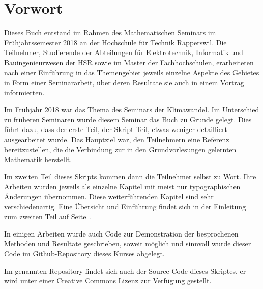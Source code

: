 %
%
%
\chapter*{Vorwort}
\rhead{}
Dieses Buch entstand im Rahmen des Mathematischen Seminars
im Frühjahrssemester 2018 an der Hochschule für Technik Rapperswil.
Die Teilnehmer, Studierende der Abteilungen für Elektrotechnik,
Informatik und Bauingenieurwesen der HSR sowie im Master der Fachhochschulen,
erarbeiteten nach einer Einführung in das Themengebiet jeweils
einzelne Aspekte des Gebietes in Form einer Seminararbeit, über
deren Resultate sie auch in einem Vortrag informierten. 

Im Frühjahr 2018 war das Thema des Seminars der Klimawandel.
Im Unterschied zu früheren Seminaren wurde diesem Seminar das Buch
\cite{skript:kaperengler}
zu Grunde gelegt.
Dies führt dazu, dass der erste Teil, der Skript-Teil, etwas weniger
detailliert ausgearbeitet wurde.
Das Hauptziel war, den Teilnehmern eine Referenz bereitzustellen,
die die Verbindung zur in den Grundvorlesungen gelernten
Mathematik herstellt.

Im zweiten Teil dieses Skripts kommen dann die Teilnehmer selbst zu Wort.
Ihre Arbeiten wurden jeweils als einzelne
Kapitel mit meist nur typographischen Änderungen übernommen.
Diese weiterführenden Kapitel sind sehr verschiedenartig.
Eine Übersicht und Einführung findet sich in der Einleitung
zum zweiten Teil auf Seite~\pageref{skript:uebersicht}.

In einigen Arbeiten wurde auch Code zur Demonstration der 
besprochenen Methoden und Resultate geschrieben, soweit
möglich und sinnvoll wurde dieser Code im Github-Repository
dieses Kurses
\cite{skript:repo}
abgelegt.

Im genannten Repository findet sich auch der Source-Code dieses
Skriptes, er wird unter einer Creative Commons Lizenz
zur Verfügung gestellt.




